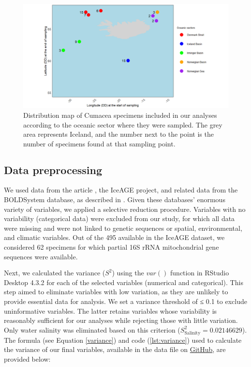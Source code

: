 \begin{figure}[htbp]
    \centering
    \includegraphics[width=\textwidth]{figuremap.png}
    \caption{Distribution map of Cumacea specimens included in our analyses according to the oceanic sector where they were sampled. The grey area represents Iceland, and the number next to the point is the number of specimens found at that sampling point. \label{fig:fig2}}
\end{figure}

\subsection{Data preprocessing}
We used data from the article \citep{uhlir_adding_2021}, the IceAGE project, and related data from the BOLDSystem database, as described in \citep{uhlir_adding_2021}. Given these databases' enormous variety of variables, we applied a selective reduction procedure. Variables with no variability (categorical data) were excluded from our study, for which all data were missing and were not linked to genetic sequences or spatial, environmental, and climatic variables. Out of the 495 available in the IceAGE dataset, we considered 62 specimens for which partial 16S rRNA mitochondrial gene sequences were available.

Next, we calculated the variance ($S^2$) using the $var()$ function in RStudio Desktop 4.3.2 for each of the selected variables (numerical and categorical). This step aimed to eliminate variables with low variation, as they are unlikely to provide essential data for analysis. We set a variance threshold of ≤ 0.1 to exclude uninformative variables. The latter retains variables whose variability is reasonably sufficient for our analyses while rejecting those with little variation. Only water salinity was eliminated based on this criterion ($S^2_\text{Salinity} = 0.02146629$). The formula (see Equation \ref{variance}) and code (\autoref{lst:variance}) used to calculate the variance of our final variables, available in the data file on \href{https://github.com/tahiri-lab/Cumacea_aPhyloGeo}{GitHub}, are provided below:

